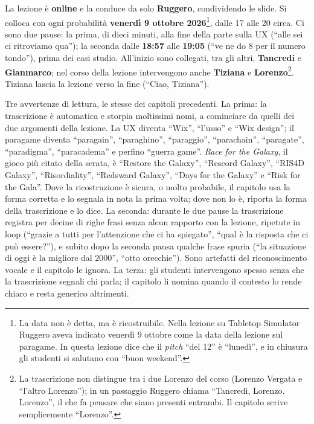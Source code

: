 La lezione è \textbf{online} e la conduce da solo \textbf{Ruggero}, condividendo le
slide. Si colloca con ogni probabilità \textbf{venerdì 9 ottobre 2026}\footnote{La
data non è detta, ma è ricostruibile. Nella lezione su Tabletop Simulator Ruggero
aveva indicato venerdì 9 ottobre come la data della lezione sul paragame. In questa
lezione dice che il \emph{pitch} ``del 12'' è ``lunedì'', e in chiusura gli studenti
si salutano con ``buon weekend''.}, dalle 17 alle 20 circa. Ci sono due pause: la
prima, di dieci minuti, alla fine della parte sulla UX (``alle sei ci ritroviamo
qua''); la seconda dalle \textbf{18:57} alle \textbf{19:05} (``ve ne do 8 per il numero
tondo''), prima dei casi studio. All'inizio sono collegati, tra gli altri,
\textbf{Tancredi} e \textbf{Gianmarco}; nel corso della lezione intervengono anche
\textbf{Tiziana} e \textbf{Lorenzo}\footnote{La trascrizione non distingue tra i due
Lorenzo del corso (Lorenzo Vergata e ``l'altro Lorenzo''); in un passaggio Ruggero
chiama ``Tancredi, Lorenzo. Lorenzo'', il che fa pensare che siano presenti
entrambi. Il capitolo scrive semplicemente ``Lorenzo''.}. Tiziana lascia la lezione
verso la fine (``Ciao, Tiziana'').

Tre avvertenze di lettura, le stesse dei capitoli precedenti. La prima: la
trascrizione è automatica e storpia moltissimi nomi, a cominciare da quelli dei due
argomenti della lezione. La UX diventa ``Wix'', ``l'usso'' e ``Wix design''; il
paragame diventa ``paragain'', ``paraghino'', ``paraggio'', ``parachain'',
``paragate'', ``paradigma'', ``paracadema'' e perfino ``guerra game''. \emph{Race for
the Galaxy}, il gioco più citato della serata, è ``Restore the Galaxy'', ``Rescord
Galaxy'', ``RIS4D Galaxy'', ``Risordiality'', ``Redsward Galaxy'', ``Days for the
Galaxy'' e ``Risk for the Gala''. Dove la ricostruzione è sicura, o molto probabile, il
capitolo usa la forma corretta e lo segnala in nota la prima volta; dove non lo è,
riporta la forma della trascrizione e lo dice. La seconda: durante le due pause la
trascrizione registra per decine di righe frasi senza alcun rapporto con la lezione,
ripetute in loop (``grazie a tutti per l'attenzione che ci ha spiegato'', ``qual è la
risposta che ci può essere?''), e subito dopo la seconda pausa qualche frase spuria
(``la situazione di oggi è la migliore dal 2000'', ``otto orecchie''). Sono artefatti
del riconoscimento vocale e il capitolo le ignora. La terza: gli studenti intervengono
spesso senza che la trascrizione segnali chi parla; il capitolo li nomina quando il
contesto lo rende chiaro e resta generico altrimenti.

